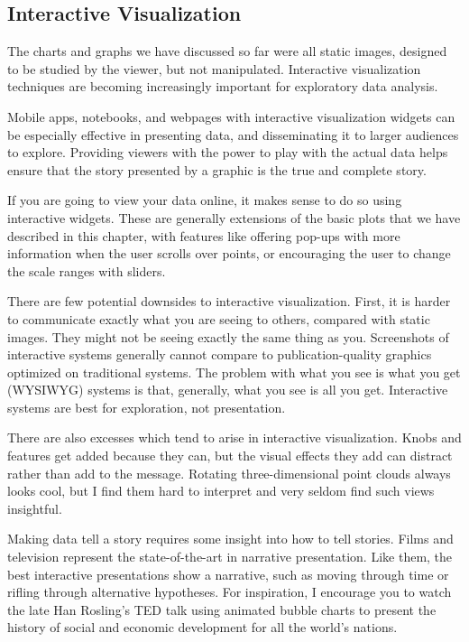 \documentclass[10pt]{article}
\begin{document}
\subsection{Interactive Visualization}
The charts and graphs we have discussed so far were all static images, designed to be studied by the viewer, but not manipulated. Interactive visualization techniques are becoming increasingly important for exploratory data analysis.

Mobile apps, notebooks, and webpages with interactive visualization widgets can be especially effective in presenting data, and disseminating it to larger audiences to explore. Providing viewers with the power to play with the actual data helps ensure that the story presented by a graphic is the true and complete story.

If you are going to view your data online, it makes sense to do so using interactive widgets. These are generally extensions of the basic plots that we have described in this chapter, with features like offering pop-ups with more information when the user scrolls over points, or encouraging the user to change the scale ranges with sliders.

There are few potential downsides to interactive visualization. First, it is harder to communicate exactly what you are seeing to others, compared with static images. They might not be seeing exactly the same thing as you. Screenshots of interactive systems generally cannot compare to publication-quality graphics optimized on traditional systems. The problem with what you see is what you get (WYSIWYG) systems is that, generally, what you see is all you get. Interactive systems are best for exploration, not presentation.

There are also excesses which tend to arise in interactive visualization. Knobs and features get added because they can, but the visual effects they add can distract rather than add to the message. Rotating three-dimensional point clouds always looks cool, but I find them hard to interpret and very seldom find such views insightful.

Making data tell a story requires some insight into how to tell stories. Films and television represent the state-of-the-art in narrative presentation. Like them, the best interactive presentations show a narrative, such as moving through time or rifling through alternative hypotheses. For inspiration, I encourage you to watch the late Han Rosling's TED talk \footnotemark using animated bubble charts to present the history of social and economic development for all the world's nations.
\end{document}
